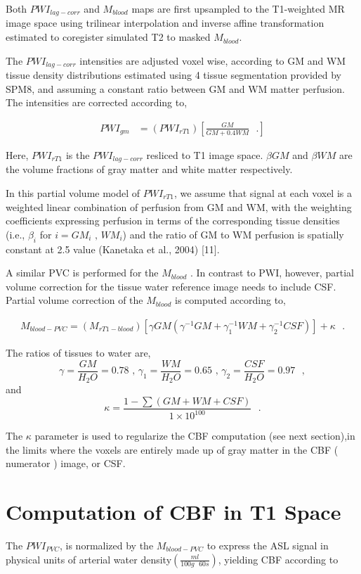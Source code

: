 \documentclass[letterpaper,11pt]{article}
\newcommand{\dis}{\displaystyle}
\newcommand{\s}{\text{ }} %
\begin{document}
Both $PWI_{lag-corr}$ and $M_{blood}$ maps are first upsampled to the T1-weighted MR image space using trilinear interpolation and inverse affine transformation estimated to coregister simulated T2 to masked $M_{blood}$.


The $PWI_{lag-corr}$ intensities are adjusted voxel wise, according to GM and WM tissue density distributions estimated using 4 tissue segmentation provided by SPM8, and assuming a constant ratio between GM and WM matter perfusion. The intensities are corrected according to,

\begin{align}
PWI_{gm} &= \left(PWI_{rT1}\right) \left[\frac{GM}{GM + 0.4 WM} \s.\right]  
\end{align}

Here, $PWI_{rT1}$ is the $PWI_{lag-corr}$ resliced to T1 image space. $\beta{GM}$ and $\beta{WM}$ are the volume fractions of gray matter and white matter respectively.  

In this partial volume model of $PWI_{rT1}$, we assume that signal at each voxel is a weighted linear combination of perfusion from GM and WM, with the weighting coefficients expressing perfusion in terms of the corresponding	tissue	densities (i.e., $\beta_i$ for $i = GM_i \text{ , } WM_i$) and the ratio of GM to WM perfusion is spatially constant at 2.5 value (Kanetaka et al., 2004) [11].

A similar PVC is performed for the $M_{blood}$ . In contrast to PWI, however, partial volume correction for the tissue water reference image needs to include CSF. Partial volume correction of the $M_{blood}$ is computed according to,

\begin{align} 
M_{blood-PVC} = \left( M_{rT1-blood} \right) \left[ \gamma{GM}\left(\gamma^{-1}{GM} + \gamma_1^{-1}{WM} + \gamma_2^{-1}{CSF} \right)\right] + \dis\kappa \s. 
\end{align}

The ratios of tissues to water are, 
$$\gamma = {\frac{GM}{H_2O} = 0.78 \text{ , } \gamma_1 = \frac{WM}{H_2O}= 0.65  \text{ , } \gamma_2 = \frac{CSF}{H_2O}= 0.97}\s,$$  
and
$$\dis\kappa = \frac{1-\sum{(GM+WM+CSF)}}{1\times{10^{100}}}\s.$$

The $\kappa$ parameter is used to regularize the CBF computation (see next section),in the limits where the voxels are entirely made up of gray matter in the CBF ( numerator ) image, or CSF.


\section*{Computation of CBF in T1 Space}
The $PWI_{PVC}$, is normalized by the $M_{blood-PVC}$ to express the ASL signal in physical units of arterial water density$\left(\frac{ml}{100g\s60s}\right)$, yielding CBF according to
\end{document}
